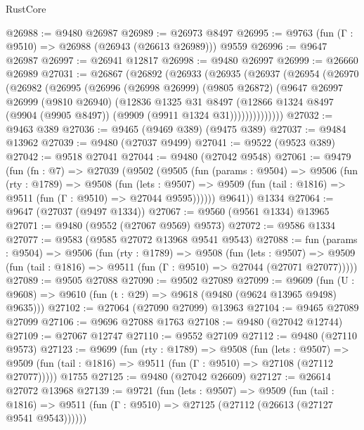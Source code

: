 \begin{lexlean}{RustCore}
\begin{coremodule}
@26988 := @9480 @26987
@26989 := @26973 @8497
@26995 := @9763 (fun (Γ : @9510) => @26988 (@26943 (@26613 @26989))) @9559
@26996 := @9647 @26987
@26997 := @26941 @12817
@26998 := @9480 @26997
@26999 := @26660 @26989
@27031 := @26867
    (@26892
      (@26933
        (@26935
          (@26937
            (@26954
              (@26970
                (@26982
                  (@26995
                    (@26996
                      (@26998 @26999)
                      (@9805 @26872)
                      (@9647
                        @26997
                        @26999
                        (@9810 @26940)
                        (@12836
                          @1325
                          @31
                          @8497
                          (@12866
                            @1324
                            @8497
                            (@9904 (@9905 @8497))
                            (@9909 (@9911 @1324 @31))))))))))))))
@27032 := @9463 @389
@27036 := @9465 (@9469 @389) (@9475 @389)
@27037 := @9484 @13962
@27039 := @9480 (@27037 @9499)
@27041 := @9522 (@9523 @389)
@27042 := @9518 @27041
@27044 := @9480 (@27042 @9548)
@27061 := @9479
    (fun (fn : @7) =>
    @27039
      (@9502
        (@9505
          (fun (params : @9504) =>
          @9506
            (fun (rty : @1789) =>
            @9508
              (fun (lets : @9507) =>
              @9509 (fun (tail : @1816) => @9511 (fun (Γ : @9510) => @27044 @9595))))))
        @9641))
    @1334
@27064 := @9647 (@27037 (@9497 @1334))
@27067 := @9560 (@9561 @1334) @13965
@27071 := @9480 (@9552 (@27067 @9569) @9573)
@27072 := @9586 @1334
@27077 := @9583 (@9585 @27072 @13968 @9541 @9543)
@27088 := fun (params : @9504) =>
  @9506
    (fun (rty : @1789) =>
    @9508
      (fun (lets : @9507) =>
      @9509 (fun (tail : @1816) => @9511 (fun (Γ : @9510) => @27044 (@27071 @27077)))))
@27089 := @9505 @27088
@27090 := @9502 @27089
@27099 := @9609
    (fun (U : @9608) => @9610 (fun (t : @29) => @9618 (@9480 (@9624 @13965 @9498) @9635)))
@27102 := @27064 (@27090 @27099) @13963
@27104 := @9465 @27089 @27099
@27106 := @9696 @27088 @1763
@27108 := @9480 (@27042 @12744)
@27109 := @27067 @12747
@27110 := @9552 @27109
@27112 := @9480 (@27110 @9573)
@27123 := @9699
    (fun (rty : @1789) =>
    @9508
      (fun (lets : @9507) =>
      @9509 (fun (tail : @1816) => @9511 (fun (Γ : @9510) => @27108 (@27112 @27077)))))
    @1755
@27125 := @9480 (@27042 @26609)
@27127 := @26614 @27072 @13968
@27139 := @9721
    (fun (lets : @9507) =>
    @9509
      (fun (tail : @1816) =>
      @9511 (fun (Γ : @9510) => @27125 (@27112 (@26613 (@27127 @9541 @9543))))))

\end{coremodule}
\end{lexlean}
